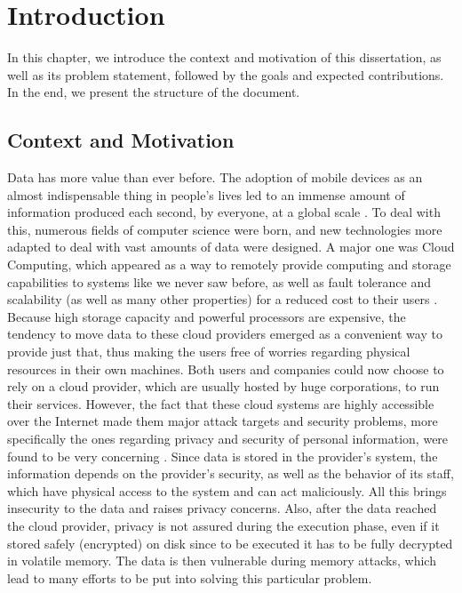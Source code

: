 \newcommand{\novathesis}{\emph{novathesis}}
\newcommand{\novathesisclass}{\texttt{novathesis.cls}}


\chapter{Introduction}
\label{cha:introduction}

In this chapter, we introduce the context and motivation of this dissertation, as well as its problem statement, followed by the goals and expected contributions. In the end, we present the structure of the document.




\section{Context and Motivation}
Data has more value than ever before. 
The adoption of mobile devices as an almost indispensable thing in people's lives led to an immense amount of information produced each second, by everyone, at a global scale \cite{dataAnalysis1,dataAnalysis2}.
To deal with this, numerous fields of computer science were born, and new technologies more adapted to deal with vast amounts of data were designed. 
A major one was Cloud Computing, which appeared as a way to remotely provide computing and storage capabilities to systems like we never saw before, as well as fault tolerance and scalability (as well as many other properties) for a reduced cost to their users \cite{cloudOrigins}. 
Because high storage capacity and powerful processors are expensive, the tendency to move data to these cloud providers emerged as a convenient way to provide just that, thus making the users free of worries regarding physical resources in their own machines. Both users and companies could now choose to rely on a cloud provider, which are usually hosted by huge corporations, to run their services.
However, the fact that these cloud systems are highly accessible over the Internet made them major attack targets \cite{cloudAttacksReport} and security problems, more specifically the ones regarding privacy and security of personal information, were found to be very concerning \cite{playstationAttack}. 
Since data is stored in the provider's system, the information depends on the provider's security, as well as the behavior of its staff, which have physical access to the system and can act maliciously. All this brings insecurity to the data and raises privacy concerns.
Also, after the data reached the cloud provider, privacy is not assured during the execution phase, even if it stored safely (encrypted) on disk since to be executed it has to be fully decrypted in volatile memory. The data is then vulnerable during memory attacks, which lead to many efforts to be put into solving this particular problem.  

